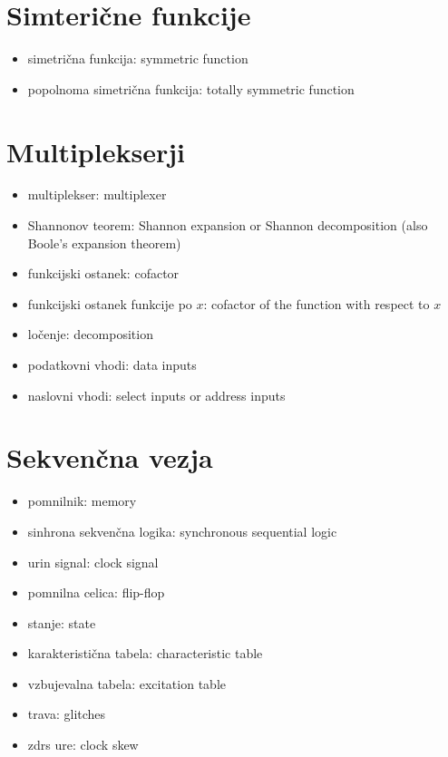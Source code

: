 \section*{Simterične funkcije}
\begin{itemize}
\item simetrična funkcija: symmetric function
\item popolnoma simetrična funkcija: totally symmetric function
\end{itemize}

\section*{Multiplekserji}
\begin{itemize}
\item multiplekser: multiplexer
\item Shannonov teorem: Shannon expansion or Shannon decomposition (also Boole's expansion theorem)
\item funkcijski ostanek: cofactor
\item funkcijski ostanek funkcije po $x$: cofactor of the function with respect to $x$
\item ločenje: decomposition
\item podatkovni vhodi: data inputs
\item naslovni vhodi: select inputs or address inputs
\end{itemize}

\section*{Sekvenčna vezja}
\begin{itemize}
\item pomnilnik: memory
\item sinhrona sekvenčna logika: synchronous sequential logic
\item urin signal: clock signal
\item pomnilna celica: flip-flop
\item stanje: state
\item karakteristična tabela: characteristic table
\item vzbujevalna tabela: excitation table
\item trava: glitches
\item zdrs ure: clock skew
\end{itemize}

